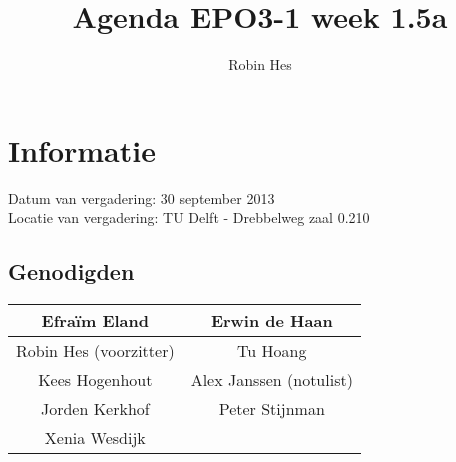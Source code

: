 \documentclass{article}
\begin{document}
\title{Agenda EPO3-1 week 1.5a}%
\author{Robin Hes}%
\maketitle

\section*{Informatie}
Datum van vergadering: 30 september 2013\\ %
Locatie van vergadering: TU Delft - Drebbelweg zaal 0.210 %
\subsection*{Genodigden}
\begin{center}
\begin{tabular}{|c |c |}
	\hline
	Efraïm Eland & Erwin de Haan \\
	\hline
	Robin Hes (voorzitter) & Tu Hoang \\
	\hline
	Kees Hogenhout & Alex Janssen (notulist)\\
	\hline
	Jorden Kerkhof & Peter Stijnman \\
	\hline
	Xenia Wesdijk & \\
	\hline
\end{tabular}
\end{center}
\end{document}
